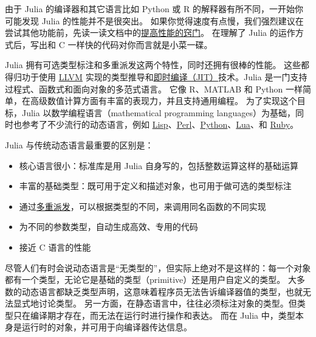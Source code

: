 由于 Julia 的编译器和其它语言比如 Python 或 R 的解释器有所不同，一开始你可能发现 Julia 的性能并不是很突出。 如果你觉得速度有点慢，我们强烈建议在尝试其他功能前，先读一读文档中的\hyperlink{818954303942149020}{提高性能的窍门}。 在理解了 Julia 的运作方式后，写出和 C 一样快的代码对你而言就是小菜一碟。



Julia 拥有可选类型标注和多重派发这两个特性，同时还拥有很棒的性能。 这些都得归功于使用 \href{https://en.wikipedia.org/wiki/Low\_Level\_Virtual\_Machine}{LLVM} 实现的类型推导和\href{https://en.wikipedia.org/wiki/Just-in-time\_compilation}{即时编译（JIT）}技术。Julia 是一门支持过程式、函数式和面向对象的多范式语言。 它像 R、MATLAB 和 Python 一样简单，在高级数值计算方面有丰富的表现力，并且支持通用编程。 为了实现这个目标，Julia 以数学编程语言（mathematical programming languages）为基础，同时也参考了不少流行的动态语言，例如 \href{https://en.wikipedia.org/wiki/Lisp\_(programming\_language)}{Lisp}、\href{https://en.wikipedia.org/wiki/Perl\_(programming\_language)}{Perl}、\href{https://en.wikipedia.org/wiki/Python\_(programming\_language)}{Python}、\href{https://en.wikipedia.org/wiki/Lua\_(programming\_language)}{Lua}、和 \href{https://en.wikipedia.org/wiki/Ruby\_(programming\_language)}{Ruby}。



Julia 与传统动态语言最重要的区别是：



\begin{itemize}
\item 核心语言很小：标准库是用 Julia 自身写的，包括整数运算这样的基础运算


\item 丰富的基础类型：既可用于定义和描述对象，也可用于做可选的类型标注


\item 通过\href{https://en.wikipedia.org/wiki/Multiple\_dispatch}{多重派发}，可以根据类型的不同，来调用同名函数的不同实现


\item 为不同的参数类型，自动生成高效、专用的代码


\item 接近 C 语言的性能

\end{itemize}


尽管人们有时会说动态语言是“无类型的”，但实际上绝对不是这样的：每一个对象都有一个类型，无论它是基础的类型（primitive）还是用户自定义的类型。 大多数的动态语言都缺乏类型声明，这意味着程序员无法告诉编译器值的类型，也就无法显式地讨论类型。 另一方面，在静态语言中，往往必须标注对象的类型。但类型只在编译期才存在，而无法在运行时进行操作和表达。 而在 Julia 中，类型本身是运行时的对象，并可用于向编译器传达信息。



